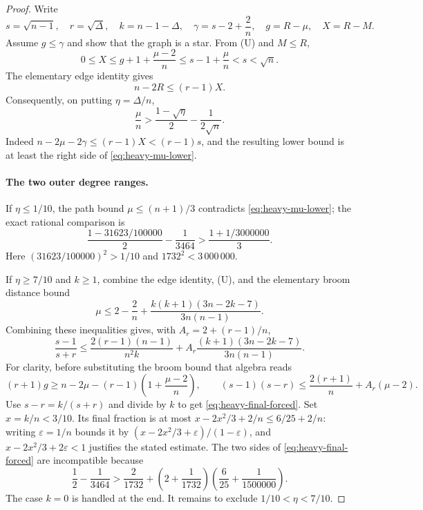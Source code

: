 \documentclass[11pt,a4paper]{article}
\theoremstyle{remark}
\numberwithin{equation}{section}
\begin{document}
\begin{proof}
Write
\[
 s=\sqrt{n-1},\quad r=\sqrt\Delta,\quad
 k=n-1-\Delta,\quad \gamma=s-2+\frac2n,
 \quad g=R-\mu,\quad X=R-M.
\]
Assume $g\le\gamma$ and show that the graph is a star. From
\textup{(U)} and $M\le R$,
\[
 0\le X\le g+1+\frac{\mu-2}{n}
       \le s-1+\frac\mu n<s<\sqrt n.
\]
The elementary edge identity gives
\[
 n-2R\le(r-1)X.
\]
Consequently, on putting $\eta=\Delta/n$,
\begin{equation}\label{eq:heavy-mu-lower}
 \frac\mu n>
 \frac{1-\sqrt\eta}{2}-\frac1{2\sqrt n}.
\end{equation}
Indeed $n-2\mu-2\gamma\le(r-1)X<(r-1)s$, and the resulting lower bound
is at least the right side of \eqref{eq:heavy-mu-lower}.

\paragraph{The two outer degree ranges.}
If $\eta\le1/10$, the path bound $\mu\le(n+1)/3$ contradicts
\eqref{eq:heavy-mu-lower}; the exact rational comparison is
\[
 \frac{1-31623/100000}{2}-\frac1{3464}
 >\frac{1+1/3000000}{3}.
\]
Here $(31623/100000)^2>1/10$ and $1732^2<3\,000\,000$.

If $\eta\ge7/10$ and $k\ge1$, combine the edge identity,
\textup{(U)}, and the elementary broom distance bound
\[
 \mu\le2-\frac2n+
 \frac{k(k+1)(3n-2k-7)}{3n(n-1)}.
\]
Combining these inequalities gives, with $A_r=2+(r-1)/n$,
\begin{equation}\label{eq:heavy-final-forced}
 \frac{s-1}{s+r}\le
 \frac{2(r-1)(n-1)}{n^2k}+
 A_r\frac{(k+1)(3n-2k-7)}{3n(n-1)}.
\end{equation}
For clarity, before substituting the broom bound that algebra reads
\[
 (r+1)g\ge n-2\mu-(r-1)\left(1+\frac{\mu-2}{n}\right),
 \qquad
 (s-1)(s-r)\le\frac{2(r+1)}n+A_r(\mu-2).
\]
Use $s-r=k/(s+r)$ and divide by $k$ to get
\eqref{eq:heavy-final-forced}. Set $x=k/n<3/10$. Its final fraction is at
most $x-2x^2/3+2/n\le6/25+2/n$: writing $\varepsilon=1/n$ bounds it by
$(x-2x^2/3+\varepsilon)/(1-\varepsilon)$, and
$x-2x^2/3+2\varepsilon<1$ justifies the stated estimate.
The two sides of \eqref{eq:heavy-final-forced} are incompatible because
\[
 \frac12-\frac1{3464}
 >\frac2{1732}+
  \left(2+\frac1{1732}\right)
  \left(\frac6{25}+\frac1{1500000}\right).
\]
The case $k=0$ is handled at the end. It remains to exclude
$1/10<\eta<7/10$.


\end{proof}
\end{document}
